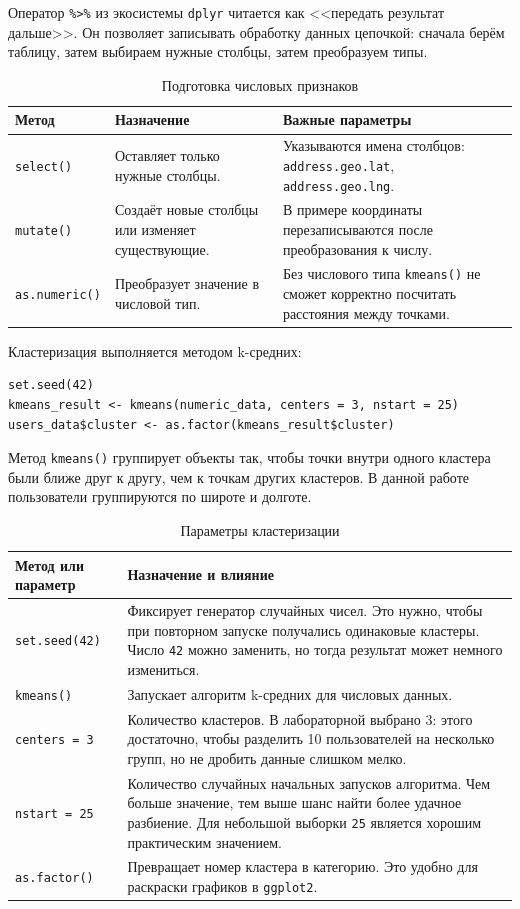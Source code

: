 \documentclass[14pt,a4paper]{extarticle}
\begin{document}
Оператор \texttt{\%>\%} из экосистемы \texttt{dplyr} читается как <<передать результат дальше>>. Он позволяет записывать обработку данных цепочкой: сначала берём таблицу, затем выбираем нужные столбцы, затем преобразуем типы.

\begin{table}[H]
\caption{Подготовка числовых признаков}
\begin{tabularx}{\textwidth}{|l|Y|Y|}
\hline
\textbf{Метод} & \textbf{Назначение} & \textbf{Важные параметры} \\
\hline
\texttt{select()} & Оставляет только нужные столбцы. & Указываются имена столбцов: \texttt{address.geo.lat}, \texttt{address.geo.lng}. \\
\hline
\texttt{mutate()} & Создаёт новые столбцы или изменяет существующие. & В примере координаты перезаписываются после преобразования к числу. \\
\hline
\texttt{as.numeric()} & Преобразует значение в числовой тип. & Без числового типа \texttt{kmeans()} не сможет корректно посчитать расстояния между точками. \\
\hline
\end{tabularx}
\end{table}

Кластеризация выполняется методом k-средних:

\begin{lstlisting}
set.seed(42)
kmeans_result <- kmeans(numeric_data, centers = 3, nstart = 25)
users_data$cluster <- as.factor(kmeans_result$cluster)
\end{lstlisting}

Метод \texttt{kmeans()} группирует объекты так, чтобы точки внутри одного кластера были ближе друг к другу, чем к точкам других кластеров. В данной работе пользователи группируются по широте и долготе.

\begin{table}[H]
\caption{Параметры кластеризации}
\begin{tabularx}{\textwidth}{|l|Y|}
\hline
\textbf{Метод или параметр} & \textbf{Назначение и влияние} \\
\hline
\texttt{set.seed(42)} & Фиксирует генератор случайных чисел. Это нужно, чтобы при повторном запуске получались одинаковые кластеры. Число \texttt{42} можно заменить, но тогда результат может немного измениться. \\
\hline
\texttt{kmeans()} & Запускает алгоритм k-средних для числовых данных. \\
\hline
\texttt{centers = 3} & Количество кластеров. В лабораторной выбрано 3: этого достаточно, чтобы разделить 10 пользователей на несколько групп, но не дробить данные слишком мелко. \\
\hline
\texttt{nstart = 25} & Количество случайных начальных запусков алгоритма. Чем больше значение, тем выше шанс найти более удачное разбиение. Для небольшой выборки \texttt{25} является хорошим практическим значением. \\
\hline
\texttt{as.factor()} & Превращает номер кластера в категорию. Это удобно для раскраски графиков в \texttt{ggplot2}. \\
\hline
\end{tabularx}
\end{table}
\end{document}
